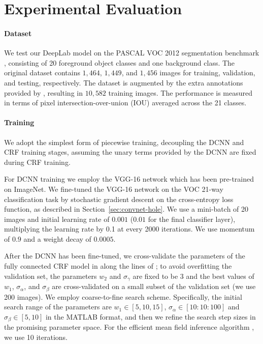 \section{Experimental Evaluation}
\label{sec:experiments}

\paragraph{Dataset} We test our DeepLab model on the PASCAL VOC 2012 segmentation benchmark \citep{everingham2014pascal}, consisting of 20 foreground object classes and one background class. The original dataset contains $1,464$, $1,449$, and $1,456$ images for training, validation, and testing, respectively. The dataset is augmented by the extra annotations provided by \citet{hariharan2011semantic}, resulting in $10,582$ training images. The performance is measured in terms of pixel intersection-over-union (IOU) averaged across the 21 classes. 

\paragraph{Training} We adopt the simplest form of piecewise training, decoupling the DCNN and CRF training stages, assuming the unary terms provided by the DCNN are fixed during CRF training. 

For DCNN training we employ the VGG-16 network which has been pre-trained on ImageNet. We fine-tuned the VGG-16 network on the VOC 21-way classification task by stochastic gradient descent on the cross-entropy loss function, as described in Section~\ref{sec:convnet-hole}. We use a mini-batch of 20 images and initial learning rate of $0.001$ ($0.01$ for the final classifier layer), multiplying the learning rate by 0.1 at every 2000 iterations. We use momentum of $0.9$ and a weight decay of $0.0005$.

After the DCNN has been fine-tuned, we cross-validate the parameters of the fully connected CRF model in  along the lines of \citet{krahenbuhl2011efficient};
 to avoid overfitting the validation set, the parameters $w_2$ and $\sigma_\gamma$ are fixed to be $3$ and the best values of $w_1$, $\sigma_\alpha$, and $\sigma_\beta$ are cross-validated on a small subset of the validation set (we use 200 images). We employ coarse-to-fine search scheme. Specifically, the initial search range of the parameters are $w_1 \in [5, 10, 15]$, $\sigma_\alpha \in [10:10:100]$ and $\sigma_\beta \in [5, 10]$ in the MATLAB format, and then we refine the search step sizes in the promising parameter space. For the efficient mean field inference algorithm \citep{krahenbuhl2011efficient}, we use 10 iterations. 


